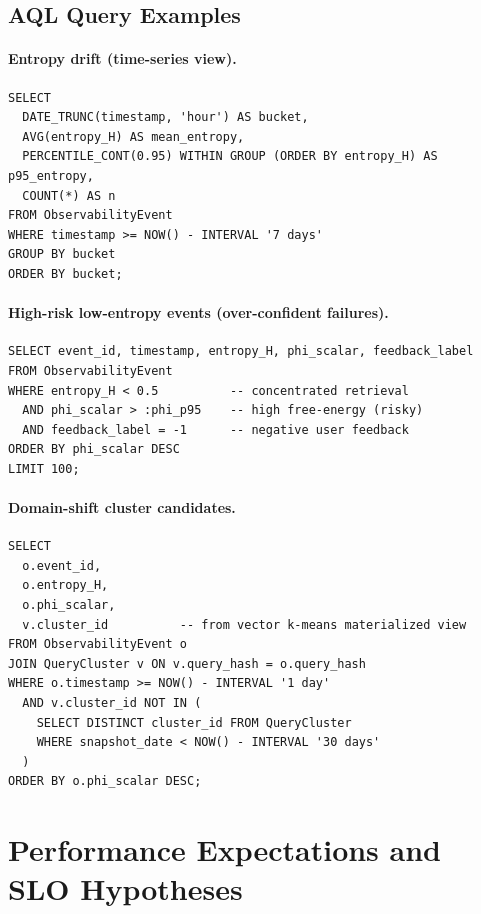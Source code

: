 \documentclass[11pt,a4paper]{article}
\theoremstyle{definition}
\begin{document}
\subsection{AQL Query Examples}
\label{sec:aql_examples}

\paragraph{Entropy drift (time-series view).}
\begin{verbatim}
SELECT
  DATE_TRUNC(timestamp, 'hour') AS bucket,
  AVG(entropy_H) AS mean_entropy,
  PERCENTILE_CONT(0.95) WITHIN GROUP (ORDER BY entropy_H) AS p95_entropy,
  COUNT(*) AS n
FROM ObservabilityEvent
WHERE timestamp >= NOW() - INTERVAL '7 days'
GROUP BY bucket
ORDER BY bucket;
\end{verbatim}

\paragraph{High-risk low-entropy events (over-confident failures).}
\begin{verbatim}
SELECT event_id, timestamp, entropy_H, phi_scalar, feedback_label
FROM ObservabilityEvent
WHERE entropy_H < 0.5          -- concentrated retrieval
  AND phi_scalar > :phi_p95    -- high free-energy (risky)
  AND feedback_label = -1      -- negative user feedback
ORDER BY phi_scalar DESC
LIMIT 100;
\end{verbatim}

\paragraph{Domain-shift cluster candidates.}
\begin{verbatim}
SELECT
  o.event_id,
  o.entropy_H,
  o.phi_scalar,
  v.cluster_id          -- from vector k-means materialized view
FROM ObservabilityEvent o
JOIN QueryCluster v ON v.query_hash = o.query_hash
WHERE o.timestamp >= NOW() - INTERVAL '1 day'
  AND v.cluster_id NOT IN (
    SELECT DISTINCT cluster_id FROM QueryCluster
    WHERE snapshot_date < NOW() - INTERVAL '30 days'
  )
ORDER BY o.phi_scalar DESC;
\end{verbatim}

\section{Performance Expectations and SLO Hypotheses}
\label{sec:performance}
\end{document}
